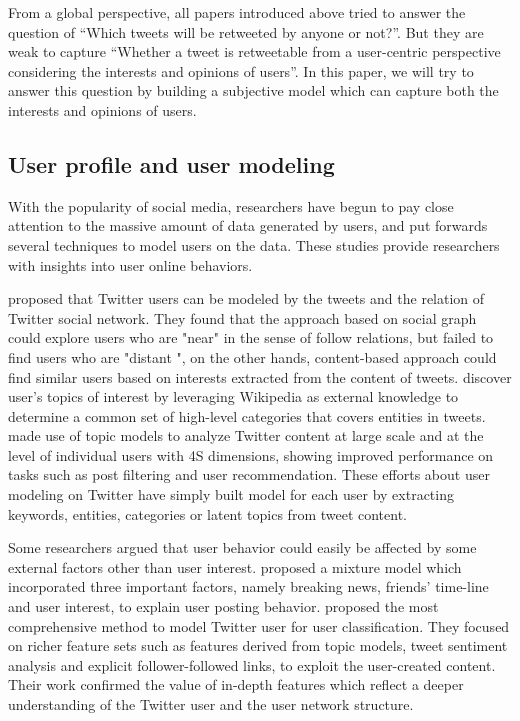 \documentclass{acm_proc_article-sp}
\begin{document}
From a global perspective, all papers introduced above tried to answer the question of ``Which tweets will be retweeted by anyone or not?''. 
But they are weak to capture ``Whether a tweet is retweetable from a user-centric perspective considering the interests and opinions of users''. 
In this paper, we will try to answer this question by building a subjective model which can capture both the interests and opinions of users.

\subsection{User profile and user modeling}
With the popularity of social media, researchers have begun to pay close attention to the massive amount of data generated by users, and put forwards several techniques to model users on the data. These studies provide researchers with insights into user online behaviors. 

\cite{Hannon:2010} proposed that Twitter users can be modeled by the tweets and the relation of Twitter social network.
They found that the approach based on social graph could explore users who are "near" in the sense of follow relations, but failed to find users who are "distant ", on the other hands, content-based approach could find similar users based on interests extracted from the content of tweets. 
\cite{conf/icwsm/MacskassyM11} discover user's topics of interest by leveraging Wikipedia as external knowledge to determine a common set of high-level categories that covers entities in tweets. 
\cite{RamageEtAl:10} made use of topic models to analyze Twitter content at large scale and at the level of individual users with 4S dimensions, showing improved performance on tasks such as post filtering and user recommendation. 
These efforts about user modeling on Twitter have simply built model for each user by extracting keywords, entities, categories or latent topics from tweet content. 

Some researchers argued that user behavior could easily be affected by some external factors other than user interest.
\cite{Xu:2012MUP} proposed a mixture model which incorporated three important factors, namely breaking news, friends' time-line and user interest, to explain user posting behavior.
\cite{Pennacchiotti:icwsm11} proposed the most comprehensive method to model Twitter user for user classification. They focused on richer feature sets such as features derived from topic models, tweet sentiment analysis and explicit follower-followed links, to exploit the user-created content. 
Their work confirmed the value of in-depth features which reflect a deeper understanding of the Twitter user and the user network structure.
\end{document}
